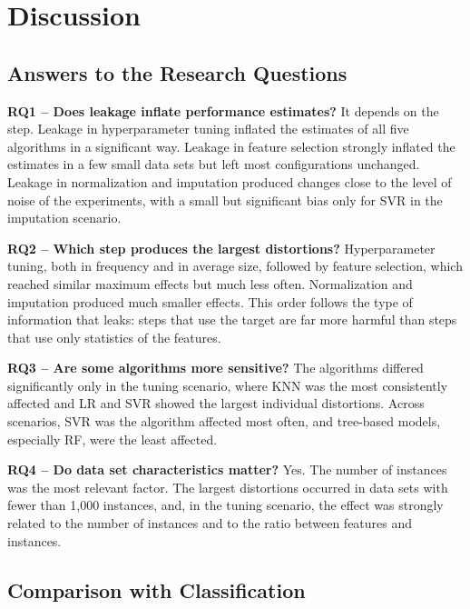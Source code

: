 \section{Discussion}
\label{sec:res-discussao}

\subsection{Answers to the Research Questions}

\textbf{RQ1 -- Does leakage inflate performance estimates?} It depends on the
step. Leakage in hyperparameter tuning inflated the estimates of all five
algorithms in a significant way. Leakage in feature selection strongly inflated
the estimates in a few small data sets but left most configurations unchanged.
Leakage in normalization and imputation produced changes close to the level of
noise of the experiments, with a small but significant bias only for SVR in the
imputation scenario.

\textbf{RQ2 -- Which step produces the largest distortions?} Hyperparameter
tuning, both in frequency and in average size, followed by feature selection,
which reached similar maximum effects but much less often. Normalization and
imputation produced much smaller effects. This order follows the type of
information that leaks: steps that use the target are far more harmful than
steps that use only statistics of the features.

\textbf{RQ3 -- Are some algorithms more sensitive?} The algorithms differed
significantly only in the tuning scenario, where KNN was the most consistently
affected and LR and SVR showed the largest individual distortions. Across
scenarios, SVR was the algorithm affected most often, and tree-based models,
especially RF, were the least affected.

\textbf{RQ4 -- Do data set characteristics matter?} Yes. The number of instances
was the most relevant factor. The largest distortions occurred in data sets with
fewer than 1,000 instances, and, in the tuning scenario, the effect was strongly
related to the number of instances and to the ratio between features and
instances.

\subsection{Comparison with Classification}

